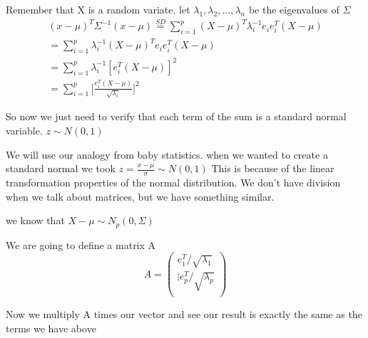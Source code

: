 Remember that X is a random variate.
let \(\lambda_1,\lambda_2, ..., \lambda_n\) be the eigenvalues of $\Sigma$
\begin{gather*}
    (x-\mu)^T\Sigma^{-1}
    (x-\mu) \overset{SD}{=} \sum_{i=1}^{p}(X-\mu)^T\lambda_i ^{-1}e_ie_i^T(X-\mu)\\
    = \sum_{i=1}^{p}\lambda_i^{-1}(X-\mu)^T e_ie_i^T(X-\mu)\\
    = \sum_{i=1}^{p}\lambda_i^{-1} [e_i^T(X-\mu)]^2\\
    = \sum_{i=1}^{p}\bigg[\frac{e_i^T(X-\mu)}{\sqrt{\lambda_i}}\bigg]^2
\end{gather*}

So now we just need to verify that each term of the sum is a standard normal variable. $z \sim N(0,1)$

We will use our analogy from baby statistics. when we wanted to create a standard normal we took $z=\frac{x-\mu}{\sigma} \sim N(0,1)$ This is because of the linear transformation properties of the normal distribution. We don't have division when we talk about matrices, but we have something similar.

we know that $X-\mu \sim N_p(0,\Sigma)$

We are going to define a matrix A
\[A= \begin{pmatrix}
e_1^T/\sqrt{\lambda_1} \\
\vdots
e_p^T/\sqrt{\lambda_p} \\
\end{pmatrix}
\]

Now we multiply A times our vector and see our result is exactly the same as the terms we have above

